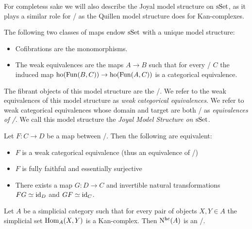 For completess sake we will also describe the Joyal model structure on $\operatorname{sSet}$, as it plays a similar role for \inftycats/ as the Quillen model structure does for Kan-complexes.
\begin{prop}
    The following two classes of maps endow $\operatorname{sSet}$ with a unique model structure:
    \begin{itemize}
        \item Cofibrations are the monomorphisms.
        \item The weak equivalences are the maps $A\to B$ such that for every \inftycat/ $C$ the induced map $\operatorname{ho}(\operatorname{Fun}(B,C))\to\operatorname{ho}(\operatorname{Fun}(A,C))$ is a categorical equivalence.
    \end{itemize}
    The fibrant objects of this model structure are the \inftycats/.
    We refer to the weak equivalences of this model structure as \emph{weak categorical equivalences}.
    We refer to weak categorical equivalences whose domain and target are both \inftycats/ as \emph{equivalences of \inftycats/}.
    We call this model structure the \emph{Joyal Model Structure on $\operatorname{sSet}$}.
    \begin{reference}
        \cite[Definition 3.3.7 and Theorem 3.6.8]{cisinski_2019}
    \end{reference}
\end{prop}
\begin{prop}
    Let $F\colon C\to D$ be a map between \inftycats/.
    Then the following are equivalent:
    \begin{itemize}
        \item $F$ is a weak categorical equivalence (thus an equivalence of \inftycats/)
        \item $F$ is fully faithful and essentially surjective
        \item There exists a map $G\colon D\to C$ and invertible natural transformations $FG\simeq \text{id}_D$ and $GF\simeq \text{id}_C$.
    \end{itemize}
    \begin{reference}
        \cite[Corollary 3.6.6 and Theorem 3.9.7]{cisinski_2019}
    \end{reference}
\end{prop}
\begin{prop}
    Let $A$ be a simplicial category such that for every pair of objects $X,Y\in A$ the simplicial set $\operatorname{Hom}_A(X,Y)$ is a Kan-complex.
    Then $\operatorname{N^{hc}}(A)$ is an \inftycat/.
    \begin{reference}
        \cite[Theorem 2.4.5.1]{kerodon}
    \end{reference}
\end{prop}
